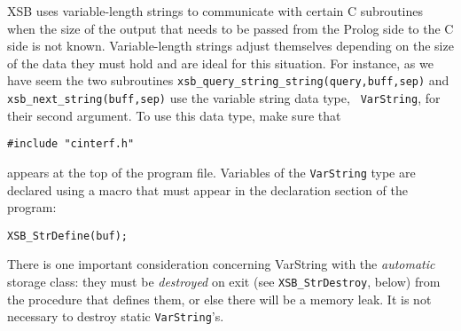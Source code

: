  XSB uses variable-length strings to communicate with
certain C subroutines when the size of the output that needs to be passed
from the Prolog side to the C side is not known. Variable-length strings
adjust themselves depending on the size of the data they must hold and are
ideal for this situation. For instance, as we have seem the two subroutines
{\tt xsb\_query\_string\_string(query,buff,sep)} and {\tt
  xsb\_next\_string(buff,sep)} use the variable string data type, {\tt
  VarString}, for their second argument.  To use this data type, make sure
that
\begin{verbatim}
#include "cinterf.h"  
\end{verbatim}
appears at the top of the program file.  Variables of the {\tt VarString}
type are declared using a macro that must appear in the declaration section
of the program:
\begin{verbatim}
XSB_StrDefine(buf);  
\end{verbatim}
There is one important consideration concerning VarString with the
\emph{automatic} storage class: they must be
\emph{destroyed} on exit (see {\tt XSB\_StrDestroy}, below) from the procedure
that defines them, or else there will be a memory leak. 
It is not necessary to destroy static {\tt VarString}'s.

